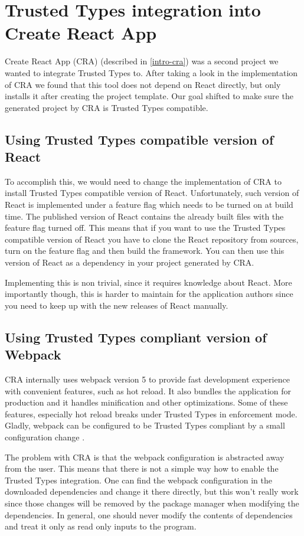 \chapter{Trusted Types integration into Create React App}

Create React App (CRA) (described in \ref{intro-cra}) was a second project we wanted to integrate
Trusted Types to. After taking a look in the implementation of CRA we found that this tool does not
depend on React directly, but only installs it after creating the project template. Our goal shifted
to make sure the generated project by CRA is Trusted Types compatible.

\section{Using Trusted Types compatible version of React}

To accomplish this, we would need to change the implementation of CRA to install Trusted Types
compatible version of React. Unfortunately, such version of React is implemented under a feature
flag which needs to be turned on at build time. The published version of React contains the already
built files with the feature flag turned off. This means that if you want to use the Trusted Types
compatible version of React you have to clone the React repository from sources, turn on the feature
flag and then build the framework. You can then use this version of React as a dependency in your
project generated by CRA.

Implementing this is non trivial, since it requires knowledge about React. More importantly though,
this is harder to maintain for the application authors since you need to keep up with the new
releases of React manually.

\section{Using Trusted Types compliant version of Webpack}

CRA internally uses webpack version 5 to provide fast development experience with convenient
features, such as hot reload. It also bundles the application for production and it handles
minification and other optimizations. Some of these features, especially hot reload breaks under
Trusted Types in enforcement mode. Gladly, webpack can be configured to be Trusted Types compliant
by a small configuration change \cite{webpack_tt_config}.

The problem with CRA is that the webpack configuration is abstracted away from the user. This means
that there is not a simple way how to enable the Trusted Types integration. One can find the webpack
configuration in the downloaded dependencies and change it there directly, but this won't really
work since those changes will be removed by the package manager when modifying the dependencies. In
general, one should never modify the contents of dependencies and treat it only as read only inputs
to the program.

